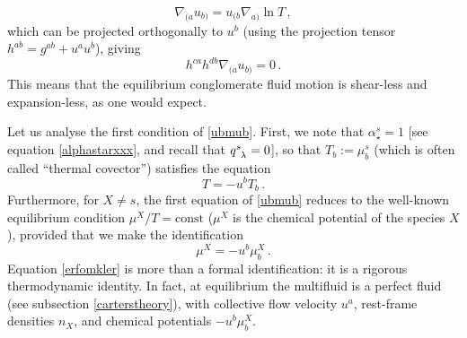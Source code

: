 \documentclass[a4paper, amsfonts, amssymb, amsmath, reprint, showkeys, nofootinbib, twoside, onecolumn,notitlepage]{revtex4-1}
\theoremstyle{definition}
\theoremstyle{theorem}
\begin{document}
\begin{equation}\label{nablaua}
\nabla_{(a}u_{b)}= u_{(b}\nabla_{a)} \ln T \, ,
\end{equation}
which can be projected orthogonally to $u^b$ (using the projection tensor $h^{ab}=g^{ab}+u^a u^b$), giving
\begin{equation}
h^{ca}h^{db}\nabla_{(a}u_{b)} =0 \, .
\end{equation}
This means that the equilibrium conglomerate fluid motion is shear-less and expansion-less, as one would expect.

Let us analyse the first condition of \eqref{ubmub}. First, we note that $\alpha_\star^s=1$ [see equation \eqref{alphastarxxx}, and recall that $q\indices{^s _\lambda}=0$], so that $T_b := \mu^s_b$ (which is often called ``thermal covector'') satisfies the equation
\begin{equation}\label{emfvlce}
T=-u^b  T_b \, .
\end{equation} 
Furthermore, for $X \neq s$, the first equation of \eqref{ubmub} reduces to the well-known equilibrium condition $\mu^X/T=\text{const}$ ($\mu^X$ is the chemical potential of the species $X$), provided that we make the identification
\begin{equation}\label{erfomkler}
\mu^X =-u^b \mu^X_b \, .
\end{equation} 
Equation \eqref{erfomkler} is more than a formal identification: it is a rigorous thermodynamic identity. In fact, at equilibrium the multifluid is a perfect fluid (see subsection \ref{carterstheory}), with collective flow velocity $u^a$, rest-frame densities $n_X$, and chemical potentials $-u^b \mu^X_b$.

\end{document}
